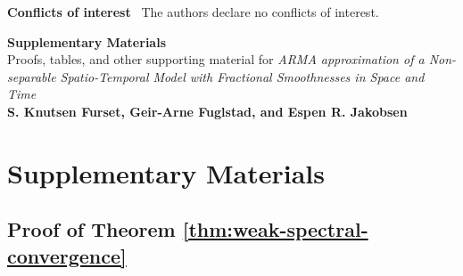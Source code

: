 \documentclass[12pt]{article} %
\begin{document}
\noindent
\textbf{Conflicts of interest} \, The authors declare no conflicts of interest.




\newpage
\begin{titlepage}
    \centering
    \vspace*{5cm}
    
    {\Huge \textbf{Supplementary Materials}} \\[1.5cm]
    {\Large Proofs, tables, and other supporting material for \textit{ARMA approximation of a Non-separable Spatio-Temporal Model with Fractional Smoothnesses in Space and Time}} \\[2cm]
    
    \textbf{S. Knutsen Furset, Geir-Arne Fuglstad, and Espen R.
    Jakobsen} \\
    
    \vfill
\end{titlepage}
\newpage

\appendix
\renewcommand{\thesection}{S} 

\setcounter{table}{0}
\renewcommand{\thetable}{S\arabic{table}}
\setcounter{figure}{0}
\renewcommand{\thefigure}{S\arabic{figure}}
\renewcommand{\theequation}
{S\arabic{equation}}
\setcounter{equation}{0}
\setcounter{theorem}{0}
\setcounter{remark}{0}

\section{Supplementary Materials}

\subsection{Proof of Theorem \ref{thm:weak-spectral-convergence}} \label{suppl:proof-thm-1}
\end{document}
